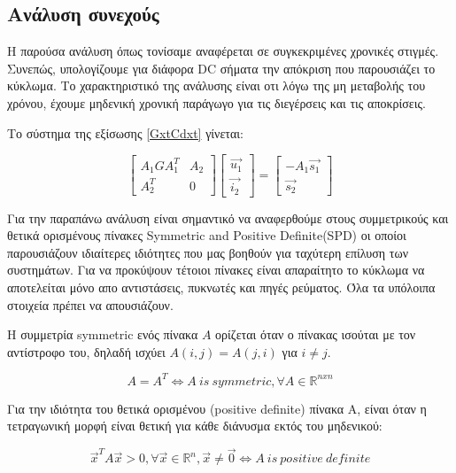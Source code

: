 \subsection{Ανάλυση συνεχούς}
Η παρούσα ανάλυση όπως τονίσαμε αναφέρεται σε συγκεκριμένες χρονικές στιγμές. Συνεπώς, υπολογίζουμε για διάφορα \textlatin{DC} σήματα την απόκριση που παρουσιάζει το κύκλωμα. Το χαρακτηριστικό της ανάλυσης είναι οτι λόγω της μη μεταβολής του χρόνου, έχουμε μηδενική χρονική παράγωγο για τις διεγέρσεις και τις αποκρίσεις.

Το σύστημα της εξίσωσης \ref{GxtCdxt} γίνεται:

\begin{equation}
    \begin{bmatrix}
        A_1 G A_1^T & A_2 \\
        A_2^T & 0
    \end{bmatrix}
    \begin{bmatrix}
        \overrightarrow{u_1} \\
        \overrightarrow{i_2}
    \end{bmatrix} = 
    \begin{bmatrix}
        -A_1 \overrightarrow{s_1} \\
        \overrightarrow{s_2}
    \end{bmatrix}
\end{equation}

Για την παραπάνω ανάλυση είναι σημαντικό να αναφερθούμε στους συμμετρικούς και θετικά ορισμένους πίνακες \textlatin{Symmetric and Positive Definite(SPD)} οι οποίοι παρουσιάζουν ιδιαίτερες ιδιότητες που μας βοηθούν για ταχύτερη επίλυση των συστημάτων. Για να προκύψουν τέτοιοι πίνακες είναι απαραίτητο το κύκλωμα να αποτελείται μόνο απο αντιστάσεις, πυκνωτές και πηγές ρεύματος. Όλα τα υπόλοιπα στοιχεία πρέπει να απουσιάζουν.

H συμμετρία \textlatin{symmetric} ενός πίνακα $A$ ορίζεται όταν ο πίνακας ισούται με τον αντίστροφο του, δηλαδή ισχύει $A(i, j) = A(j, i)$ για $i \neq j$.

\begin{equation}
A = A^T \Leftrightarrow A\ is\ symmetric, \forall A \in \mathbb{R} ^{nxn}
\end{equation}

Για την ιδιότητα του θετικά ορισμένου \textlatin{(positive definite)} πίνακα Α, είναι όταν η τετραγωνική μορφή είναι θετική για κάθε διάνυσμα εκτός του μηδενικού:

\begin{equation}
\overrightarrow{x}^T A \overrightarrow{x} > 0, \forall \overrightarrow{x} \in \mathbb{R}^{n}, \overrightarrow{x} \neq
 \overrightarrow{0} \Leftrightarrow A \ is \ positive\ definite
 \end{equation}

